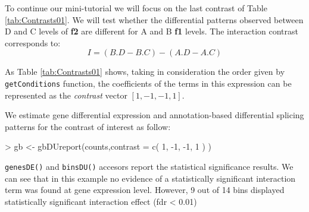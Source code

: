 \documentclass{article}
\begin{document}
\begin{table}[H]
  \noindent{}
  \caption{Test and contrasts.}
  \label{tab:Contrasts01}
\end{table}

To continue our mini-tutorial we will focus on the last contrast of Table \ref{tab:Contrasts01}. We will
test whether the differential patterns observed between D and C levels of \textbf{f2} are different for 
A and B \textbf{f1} levels. The interaction contrast corresponds to:
\begin{equation}
I = ( B.D - B.C ) - ( A.D - A.C ) 
\end{equation}

As Table \ref{tab:Contrasts01} shows, taking in consideration the order given
by \texttt{getConditions} function, the coefficients of the terms in this expression can be 
represented as the {\em contrast} vector $[ 1,-1,-1, 1]$.


We estimate gene differential expression and annotation-based differential splicing patterns for the contrast of interest as follow:  

\begin{Schunk}
\begin{Sinput}
> gb      <- gbDUreport(counts,contrast = c( 1, -1, -1, 1 ) )
\end{Sinput}
\end{Schunk}

\texttt{genesDE()} and \texttt{binsDU()} accesors report the statistical significance results. We can see that in this example no evidence of a statistically significant interaction term was found at gene expression level. However, 9 out of 14 bins displayed statistically significant interaction 
effect (fdr < 0.01) 
\end{document}
